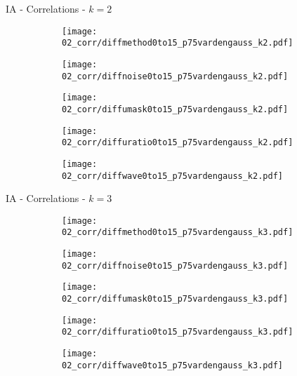 \documentclass{beamer}
\begin{document}
\begin{frame}{IA - Correlations - $k=2$}{}
\begin{figure}
\centering
\begin{subfigure}{0.19\textwidth}
\texttt{[image: 02\_corr/diffmethod0to15\_p75vardengauss\_k2.pdf]}
\end{subfigure}
\begin{subfigure}{0.19\textwidth}
\texttt{[image: 02\_corr/diffnoise0to15\_p75vardengauss\_k2.pdf]}
\end{subfigure}
\begin{subfigure}{0.19\textwidth}
\texttt{[image: 02\_corr/diffumask0to15\_p75vardengauss\_k2.pdf]}
\end{subfigure}
\begin{subfigure}{0.19\textwidth}
\texttt{[image: 02\_corr/diffuratio0to15\_p75vardengauss\_k2.pdf]}
\end{subfigure}
\begin{subfigure}{0.19\textwidth}
\texttt{[image: 02\_corr/diffwave0to15\_p75vardengauss\_k2.pdf]}
\end{subfigure}
\end{figure}
\end{frame}

\begin{frame}{IA - Correlations - $k=3$}{}
\begin{figure}
\centering
\begin{subfigure}{0.19\textwidth}
\texttt{[image: 02\_corr/diffmethod0to15\_p75vardengauss\_k3.pdf]}
\end{subfigure}
\begin{subfigure}{0.19\textwidth}
\texttt{[image: 02\_corr/diffnoise0to15\_p75vardengauss\_k3.pdf]}
\end{subfigure}
\begin{subfigure}{0.19\textwidth}
\texttt{[image: 02\_corr/diffumask0to15\_p75vardengauss\_k3.pdf]}
\end{subfigure}
\begin{subfigure}{0.19\textwidth}
\texttt{[image: 02\_corr/diffuratio0to15\_p75vardengauss\_k3.pdf]}
\end{subfigure}
\begin{subfigure}{0.19\textwidth}
\texttt{[image: 02\_corr/diffwave0to15\_p75vardengauss\_k3.pdf]}
\end{subfigure}
\end{figure}
\end{frame}
\end{document}
